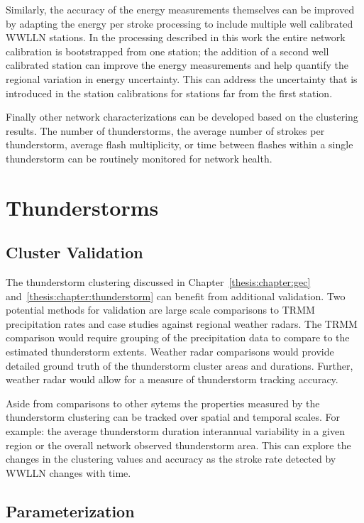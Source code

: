 Similarly, the accuracy of the energy measurements themselves can be improved by adapting the energy per stroke processing to include multiple well calibrated WWLLN stations.
In the processing described in this work the entire network calibration is bootstrapped from one station; the addition of a second well calibrated station can improve the energy measurements and help quantify the regional variation in energy uncertainty.
This can address the uncertainty that is introduced in the station calibrations for stations far from the first station.

Finally other network characterizations can be developed based on the clustering results.
The number of thunderstorms, the average number of strokes per thunderstorm, average flash multiplicity, or time between flashes within a single thunderstorm can be routinely monitored for network health.

\section{Thunderstorms}

\subsection{Cluster Validation}

The thunderstorm clustering discussed in Chapter~\ref{thesis:chapter:gec} and~\ref{thesis:chapter:thunderstorm} can benefit from additional validation.
Two potential methods for validation are large scale comparisons to TRMM precipitation rates and case studies against regional weather radars.
The TRMM comparison would require grouping of the precipitation data to compare to the estimated thunderstorm extents.
Weather radar comparisons would provide detailed ground truth of the thunderstorm cluster areas and durations.
Further, weather radar would allow for a measure of thunderstorm tracking accuracy.

Aside from comparisons to other sytems the properties measured by the thunderstorm clustering can be tracked over spatial and temporal scales.
For example: the average thunderstorm duration interannual variability in a given region or the overall network observed thunderstorm area.
This can explore the changes in the clustering values and accuracy as the stroke rate detected by WWLLN changes with time.

\subsection{Parameterization}

